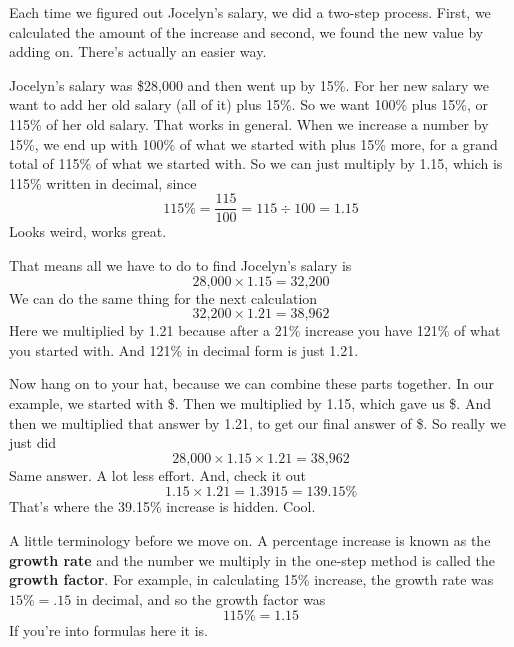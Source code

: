 Each time we figured out Jocelyn's salary, we did a two-step process.  First, we calculated the amount of the increase and second, we found the new value by adding on.  There's actually an easier way.  

Jocelyn's salary was \$28,000 and then went up by 15\%.  For her new salary we want to add her old salary (all of it) plus 15\%.  So we want 100\% plus 15\%, or 115\% of her old salary.   That works in general.  When we increase a number by 15\%, we end up with 100\% of what we started with plus 15\% more, for a grand total of 115\% of what we started with. So we can just multiply by 1.15, which is 115\% written in decimal, since $$115\% = \frac{115}{100} = 115 \div 100 = 1.15$$ Looks weird, works great.    

That means all we have to do to find Jocelyn's salary is $$\text{28,000} \times 1.15 = \text{32,200}$$  We can do the same thing for the next calculation $$\text{32,200} \times 1.21 = \text{38,962}$$  
Here we multiplied by 1.21 because after a 21\% increase you have 121\% of what you started with.  And 121\% in decimal form is just 1.21. 

Now hang on to your hat, because we can combine these parts together.  In our example, we started with \$.  Then we multiplied by 1.15, which gave us \$.  And then we multiplied that answer by 1.21, to get our final answer of \$.  So really we just did 
$$\text{28,000} \times 1.15 \times 1.21 = \text{38,962}$$  Same answer.  A lot less effort.
And, check it out $$1.15 \times 1.21 = 1.3915 =139.15\%$$ That's where the 39.15\% increase is hidden. Cool.

A little terminology before we move on.  A percentage increase is known as the \textbf{growth rate} and the number we multiply in the one-step method is called the \textbf{growth factor}.  For example, in calculating 15\% increase, the growth rate was $15\%=.15$ in decimal, and so the growth factor was $$115\%=1.15$$  If you're into formulas here it is. 

 \bigskip
 \bigskip
  
